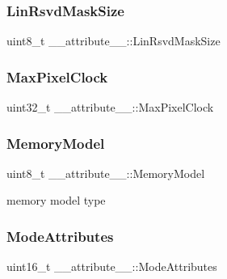 \subsubsection{\texorpdfstring{Lin\+Rsvd\+Mask\+Size}{LinRsvdMaskSize}}
{\footnotesize\ttfamily uint8\+\_\+t \+\_\+\+\_\+attribute\+\_\+\+\_\+\+::\+Lin\+Rsvd\+Mask\+Size}

\hypertarget{struct____attribute_____afd81a69353c35e8b1fb9b696931f79a5}{}\label{struct____attribute_____afd81a69353c35e8b1fb9b696931f79a5} 
\subsubsection{\texorpdfstring{Max\+Pixel\+Clock}{MaxPixelClock}}
{\footnotesize\ttfamily uint32\+\_\+t \+\_\+\+\_\+attribute\+\_\+\+\_\+\+::\+Max\+Pixel\+Clock}

\hypertarget{struct____attribute_____a0fe34321b6dfba9e784fbbc649aa193a}{}\label{struct____attribute_____a0fe34321b6dfba9e784fbbc649aa193a} 
\subsubsection{\texorpdfstring{Memory\+Model}{MemoryModel}}
{\footnotesize\ttfamily uint8\+\_\+t \+\_\+\+\_\+attribute\+\_\+\+\_\+\+::\+Memory\+Model}



memory model type 

\hypertarget{struct____attribute_____a68ea99ad36679e583fa9674016e30903}{}\label{struct____attribute_____a68ea99ad36679e583fa9674016e30903} 
\subsubsection{\texorpdfstring{Mode\+Attributes}{ModeAttributes}}
{\footnotesize\ttfamily uint16\+\_\+t \+\_\+\+\_\+attribute\+\_\+\+\_\+\+::\+Mode\+Attributes}



